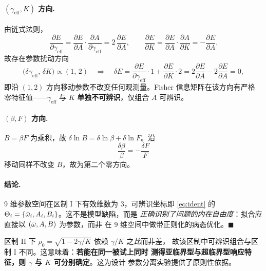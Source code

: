 \paragraph{$(\gamma_{\mathrm{eff}},K)$ 方向.}
由链式法则，
%
\begin{equation}
\frac{\partial E}{\partial\gamma_{\mathrm{eff}}}
=\frac{\partial E}{\partial A}\cdot
 \frac{\partial A}{\partial\gamma_{\mathrm{eff}}}
=2\,\frac{\partial E}{\partial A},
\qquad
\frac{\partial E}{\partial K}
=\frac{\partial E}{\partial A}\cdot\frac{\partial A}{\partial K}
=-\frac{\partial E}{\partial A} .
\end{equation}
%
故存在参数扰动方向
%
\begin{equation}
\bigl(\delta\gamma_{\mathrm{eff}},\,\delta K\bigr)\propto(1,\,2)
\quad\Longrightarrow\quad
\delta E=\frac{\partial E}{\partial\gamma_{\mathrm{eff}}}\cdot1
        +\frac{\partial E}{\partial K}\cdot2
        =2\frac{\partial E}{\partial A}-2\frac{\partial E}{\partial A}=0 ,
\end{equation}
%
即沿 $(1,2)$ 方向移动参数不改变任何观测量。Fisher 信息矩阵在该方向有严格
零特征值——$\gamma_{\mathrm{eff}}$ 与 $K$ \textbf{单独不可辨识}，仅组合
$A$ 可辨识。

\paragraph{$(\beta,F)$ 方向.}
$B=\beta F$ 为乘积，故 $\delta\ln B=\delta\ln\beta+\delta\ln F$。沿
%
\begin{equation}
\frac{\delta\beta}{\beta}=-\frac{\delta F}{F}
\end{equation}
%
移动同样不改变 $B$，故为第二个零方向。

\paragraph{结论.}
9 维参数空间在区制 I 下有效维数为 $3$，可辨识坐标即
\cref{eq:ident} 的 $\Theta_i=\{\bar{\omega}_i,A_i,B_i\}$。这不是模型缺陷，而是
\emph{正确识别了问题的内在自由度}：拟合应直接以 $(\bar{\omega},A,B)$ 为参数，而非
在 9 维空间中做带正则化的病态优化。\hfill$\blacksquare$

\begin{remark}[对超临界区的补充]
区制 II 下 $\rho_{0}=\sqrt{1-2\gamma/K}$ 依赖 $\gamma/K$ 之\emph{比}而非差，
故该区制中可辨识组合与区制 I 不同。这意味着：\textbf{若能在同一被试上同时
测得亚临界型与超临界型响应特征，则 $\gamma$ 与 $K$ 可分别确定}。这为设计
参数分离实验提供了原则性依据。
\end{remark}

